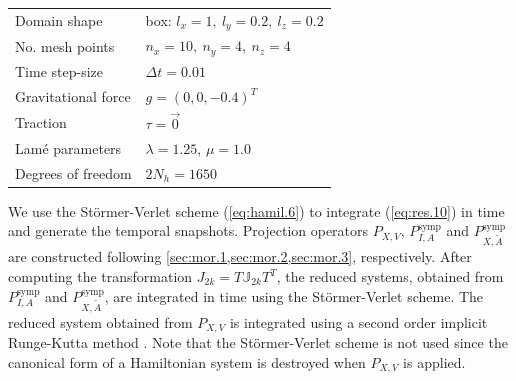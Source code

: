 \vspace{0.5cm}
\begin{center}
\begin{tabular}{|l|l|}
\hline
Domain shape & box: $l_x = 1,\ l_y = 0.2,\ l_z = 0.2$ \\
No. mesh points & $n_x = 10,\ n_y = 4,\ n_z = 4$ \\
Time step-size & $\Delta t = 0.01$ \\
Gravitational force & $g = (0,0,-0.4)^T$ \\
Traction & $\tau = \vec 0$ \\
Lam\'e parameters & $\lambda = 1.25$, $\mu = 1.0$ \\
Degrees of freedom & $2N_{h} = 1650$ \\
\hline
\end{tabular}
\end{center}
\vspace{0.5cm}
We use the St\"ormer-Verlet scheme (\ref{eq:hamil.6}) to integrate (\ref{eq:res.10}) in time and generate the temporal snapshots. Projection operators $P_{X,V}$, $P^{\text{symp}}_{I,A}$ and $P^{\text{symp}}_{X,\tilde A}$ are constructed following \cref{sec:mor.1,sec:mor.2,sec:mor.3}, respectively. After computing the transformation $J_{2k} = T \mathbb J_{2k} T^T$,  the reduced systems, obtained from $P^{\text{symp}}_{I,A}$ and $P^{\text{symp}}_{X,\tilde A}$, are integrated in time using the St\"ormer-Verlet scheme. The reduced system obtained from $P_{X,V}$ is integrated using a second order implicit Runge-Kutta method . Note that the St\"ormer-Verlet scheme is not used since the canonical form of a Hamiltonian system is destroyed when $P_{X,V}$ is applied.

